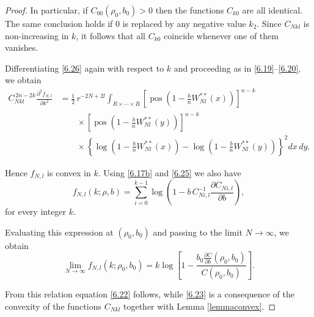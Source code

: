 \documentclass[11pt]{article}
\begin{document}
\begin{proof}
In particular, if $C_{00}(\rho_0,b_0)>0$ then the functions $C_{k0}$ are all
identical. The same conclusion holds if $0$ is replaced by any negative
value $k_2$. Since $C_{Nkl}$ is non-increasing in $k$, it follows that
all $C_{k0}$ coincide whenever one of them vanishes.

Differentiating \eqref{6.26} again with respect to $k$ and proceeding
as in \eqref{6.19}–\eqref{6.20}, we obtain
\begin{align*}
C_{Nkl}^{\,2n-2k}
\frac{\partial^2 f_{N,l}}{\partial k^2}
&=
\frac{1}{2}\,
r^{-2N+2l}
\int_{R\times\cdots\times R}
\left[
\operatorname{pos}
\!\left(
1-\frac{b}{n}W_{Nl}^{**}(x)
\right)
\right]^{n-k}
\nonumber\\
&\qquad\times
\left[
\operatorname{pos}
\!\left(
1-\frac{b}{n}W_{Nl}^{**}(y)
\right)
\right]^{n-k}
\nonumber\\
&\qquad\times
\left\{
\log\!\left(1-\frac{b}{n}W_{Nl}^{**}(x)\right)
-
\log\!\left(1-\frac{b}{n}W_{Nl}^{**}(y)\right)
\right\}^{2}
dx\,dy .
\end{align*}

Hence $f_{N,l}$ is convex in $k$.
Using \eqref{6.17b} and \eqref{6.25} we also have
\begin{equation}
f_{N,l}(k;\rho,b)
=
\sum_{i=0}^{k-1}
\log
\left(
1
-
b\,C_{Ni,l}^{-1}\frac{\partial C_{Ni,l}}{\partial b}
\right),
\tag{6.28}\label{6.28}
\end{equation}
for every integer $k$.

Evaluating this expression at $(\rho_0,b_0)$ and passing to the limit
$N\to\infty$, we obtain
\begin{equation}
    \lim_{N\to\infty}
f_{N,l}(k;\rho_0,b_0)
=
k\log
\left[
1-
\frac{b_0 \frac{\partial C}{\partial b}(\rho_0,b_0)}{C(\rho_0,b_0)}
\right]. \tag{6.29}\label{6.29}
\end{equation}

From this relation equation \eqref{6.22} follows, while \eqref{6.23}
is a consequence of the convexity of the functions $C_{Nkl}$ together
with Lemma \ref{lemmaconvex}.
\end{proof}
\end{document}
